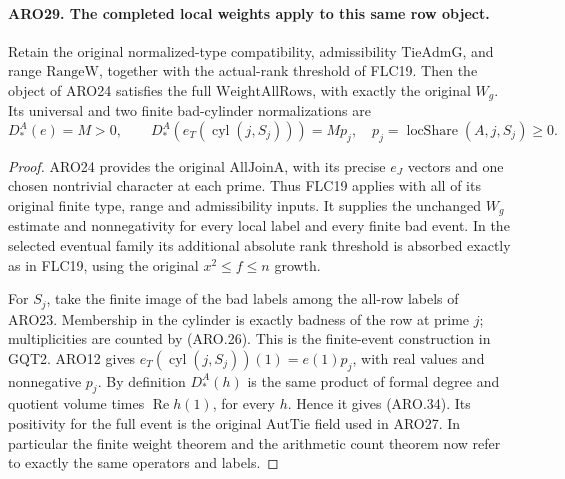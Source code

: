 \paragraph{ARO29. The completed local weights apply to this same row object.}
\label{claim:ARO29}
Retain the original normalized-type compatibility, admissibility
\(\mathrm{TieAdmG}\), and range \(\mathrm{RangeW}\), together
with the actual-rank threshold of FLC19.  Then the object of ARO24
satisfies the full \(\mathrm{WeightAllRows}\), with exactly the
original \(W_g\).  Its universal and two finite bad-cylinder
normalizations are
\[
 D_*^A(e)=M>0,\qquad
 D_*^A(e_T(\operatorname{cyl}(j,S_j)))=Mp_j,
 \quad p_j=\operatorname{locShare}(A,j,S_j)\geq0.      \tag{ARO.34}
\]
\begin{proof}
ARO24 provides the original \(\mathrm{AllJoinA}\), with its
precise \(e_J\) vectors and one chosen nontrivial character at
each prime.  Thus FLC19 applies with all of its original finite
type, range and admissibility inputs.  It supplies the unchanged
\(W_g\) estimate and nonnegativity for every local label and
every finite bad event.  In the selected eventual family its
additional absolute rank threshold is absorbed exactly as in FLC19,
using the original \(x^2\leq f\leq n\) growth.

For \(S_j\), take the finite image of the bad labels among the
all-row labels of ARO23.  Membership in the cylinder is exactly
badness of the row at prime \(j\); multiplicities are counted by
(ARO.26).  This is the finite-event construction in GQT2.
ARO12 gives \(e_T(\operatorname{cyl}(j,S_j))(1)=e(1)p_j\),
with real values and nonnegative \(p_j\).  By definition \(D_*^A(h)\)
is the same product of formal degree and quotient volume times
\(\operatorname{Re}h(1)\), for every \(h\).  Hence it gives
(ARO.34).  Its positivity for the full event is the original
\(\mathrm{AutTie}\) field used in ARO27.  In particular the
finite weight theorem and the arithmetic count theorem now refer
to exactly the same operators and labels.
\end{proof}

